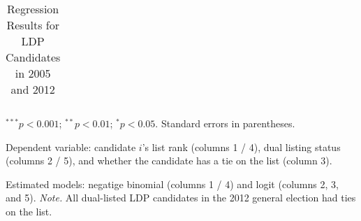 \begin{table}[!htbp]
\begin{center}
\begin{threeparttable}
\begin{tabular}{l D{.}{.}{4.5} D{.}{.}{4.5} D{.}{.}{4.5} D{.}{.}{4.5} D{.}{.}{4.5}}
\bottomrule
\end{tabular}
\begin{tablenotes}[flushleft]
\scriptsize{\item $^{***}p<0.001$; $^{**}p<0.01$; $^{*}p<0.05$. Standard errors in parentheses.
\item Dependent variable: candidate $i$'s list rank (columns 1 / 4), dual listing status (columns 2 / 5), and whether the candidate has a tie on the list (column 3).
\item Estimated models: negatige binomial (columns 1 / 4) and logit (columns 2, 3, and 5). 
\textit{Note.} All dual-listed LDP candidates in the 2012 general election had ties on the list.}
\end{tablenotes}
\end{threeparttable}
\caption{Regression Results for LDP Candidates in 2005 and 2012}
\label{tab:ldp_2005_2012}
\end{center}
\end{table}
